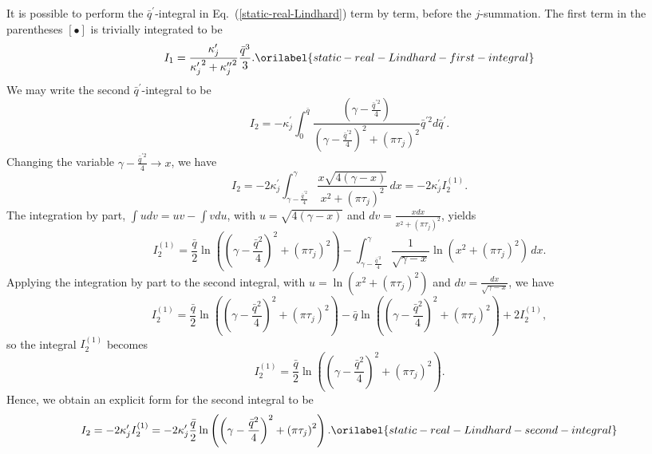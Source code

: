 \documentclass[aps,showkeys,noshowpacs,superscriptaddress,pre,preprint]{revtex4-2}
\let\label\orilabel
\begin{document}
It is possible to perform the $\bar{q}^\prime$-integral in Eq.~(\ref{static-real-Lindhard}) term by term,
before the $j$-summation.
The first term in the parentheses $[ \bullet ]$ is trivially integrated to be
\begin{equation}
I_1 = \frac{\kappa_j^\prime}{{\kappa_j^\prime}^2 + {\kappa_j^{\prime\prime}}^2}  \frac{\bar{q}^3}{3} .
\label{static-real-Lindhard-first-integral}
\end{equation}
We may write the second $\bar{q}^\prime$-integral  to be 
\begin{equation*}
I_2 = - \kappa_j^\prime \int_0^{\bar{q}} \frac{\left( \gamma - \frac{\bar{q}^{\prime 2}}{4} \right)}
{\left( \gamma - \frac{\bar{q}^{\prime 2}}{4} \right)^2 + \left( \pi \tau_j \right)^2}
\bar{q}^{\prime 2} d\bar{q}^\prime .
\end{equation*}
Changing the variable $\gamma - \frac{\bar{q}^{\prime 2}}{4} \rightarrow x$,
we have
\begin{equation*}
I_2 =  - 2 \kappa_j^\prime \int_{\gamma - \frac{\bar{q}^{\prime 2}}{4}}^{\gamma} 
\frac{x \sqrt{4 \left( \gamma - x \right)}}{x^2 + \left( \pi \tau_j \right)^2} \, dx  
= -2\kappa_j^\prime I_2^{(1)} .
\end{equation*}
The integration by part, $\int u dv = uv - \int v du$, 
with $u = \sqrt{4 \left( \gamma - x \right)}$ and $dv = \frac{x dx}{x^2 + \left( \pi \tau_j \right)^2 }$, yields
\begin{equation*}
I_2^{(1)} = \frac{\bar{q}}{2} \ln\left( \left( \gamma - \frac{\bar{q}^2}{4} \right)^2 + \left( \pi \tau_j \right)^2 \right)
-  \int_{\gamma - \frac{\bar{q}^{\prime 2}}{4}}^{\gamma} \frac{1}{\sqrt{\gamma - x}} 
\ln\left( x^2 + \left( \pi \tau_j \right)^2 \right) \, dx .
\end{equation*}
Applying the integration by part to the second integral, 
with $u = \ln \left( x^2 + \left( \pi \tau_j \right)^2 \right)$ and $dv = \frac{dx}{\sqrt{\gamma - x}}$,
we have
\begin{equation*}
I_2^{(1)} = \frac{\bar{q}}{2} \ln\left( \left( \gamma - \frac{\bar{q}^2}{4} \right)^2 + \left( \pi \tau_j \right)^2 \right)
- \bar{q} \ln\left( \left( \gamma - \frac{\bar{q}^2}{4} \right)^2 + \left( \pi \tau_j \right)^2 \right)
+ 2 I_2^{(1)} ,
\end{equation*}
so the integral $I_2^{(1)}$ becomes
\begin{equation*}
I_2^{(1)} = \frac{\bar{q}}{2} \ln\left( \left( \gamma - \frac{\bar{q}^2}{4} \right)^2 + \left( \pi \tau_j \right)^2 \right) .
\end{equation*}
Hence, we obtain an explicit form for the second integral to be
\begin{equation}
I_2 = -2 \kappa_j^\prime I_2^{(1)} = - 2 \kappa_j^\prime \frac{\bar{q}}{2} \ln\left( \left( \gamma - \frac{\bar{q}^2}{4} \right)^2 + \left( \pi \tau_j \right)^2 \right) .
\label{static-real-Lindhard-second-integral}
\end{equation}
\end{document}

